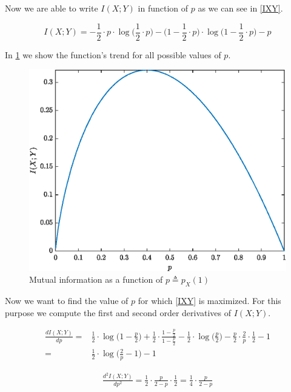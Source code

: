 Now we are able to write $I(X;Y)$ in function of $p$ as we can see in \eqref{IXY}.

\begin{equation}
	I(X;Y) = -\frac{1}{2}\cdot p \cdot \log\Big(\frac{1}{2}\cdot p\Big)-\Big(1-\frac{1}{2}\cdot p\Big)\cdot \log \Big(1-\frac{1}{2}\cdot p\Big)-p
	\label{IXY}
\end{equation}

\pagebreak

In \ref{fig:funcinfoex1} we show the function's trend for all possible values of $p$.

\begin{figure}[h!]
	\centering
	\includegraphics[width=0.7\linewidth]{img/func_info_ex1}
	\caption{Mutual information as a function of $p \triangleq p_X(1)$}
	\label{fig:funcinfoex1}
\end{figure}

Now we want to find the value of $p$ for which \eqref{IXY} is maximized. For this purpose we compute the first and second order derivatives of $I(X;Y)$.

\begin{equation}
\begin{aligned}
	\frac{dI(X;Y)}{dp}= &\frac{1}{2} \cdot \log \Big( 1 - \frac{p}{2}\Big)+ \frac{1}{2} \cdot \frac{1- \frac{p}{2}}{1-\frac{p}{2}} - \frac{1}{2} \cdot \log\Big ( \frac{p}{2}\Big)-\frac{p}{2} \cdot \frac{2}{p} \cdot \frac{1}{2} - 1 \\
	= & \frac{1}{2} \cdot \log \Big ( \frac{2}{p} - 1\Big)-1
	\end{aligned}
	\end{equation}

\begin{equation}
\begin{aligned}
	\frac{d^2I(X;Y)}{dp^2}= \frac{1}{2}\cdot \frac{p}{2-p} \cdot \frac{1}{2}= \frac{1}{4} \cdot \frac{p}{2-p}
\end{aligned}
\end{equation}

